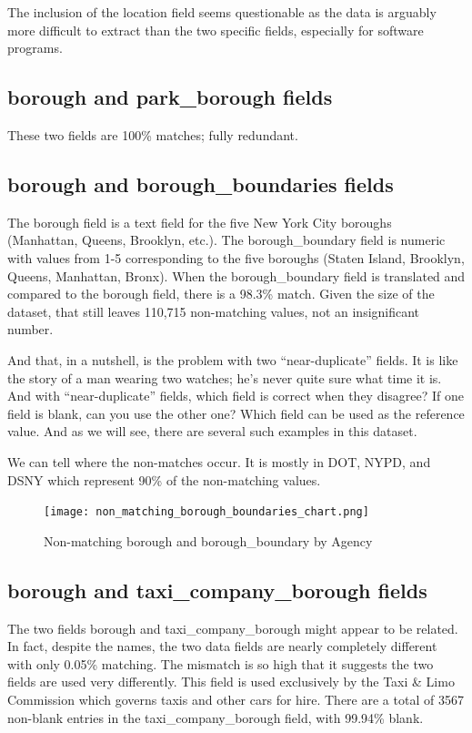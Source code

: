 \documentclass[12pt, titlepage]{article}
\begin{document}
{The inclusion of the location field seems questionable as the data is arguably more difficult to extract than the two specific fields, especially for
software programs.

\subsection{borough and park\_borough fields}  These two fields are 100\% matches; fully redundant.

\subsection{borough and borough\_boundaries fields}  The borough field is a text field for the five New York City boroughs (Manhattan, Queens, Brooklyn, etc.).
The borough\_boundary field is numeric with values from 1-5 corresponding to the five boroughs (Staten Island, Brooklyn, Queens, Manhattan, Bronx).
When the borough\_boundary field is translated and compared to the borough field, there is a 98.3\% match. Given the size of the dataset, that 
still leaves 110,715 non-matching values, not an insignificant number.  

And that, in a nutshell, is the problem with two ``near-duplicate'' fields. It is like the  story of a man wearing two watches; he's never
quite sure what time it is. And with ``near-duplicate'' fields, which field is correct when they disagree? 
If one field is blank, can you use the other one? Which field can be used as the reference value.
 And as we will see, there are several such examples in this dataset.

We can tell where the non-matches occur. It is mostly in DOT, NYPD, and DSNY which represent 90\% of the non-matching values.

	\begin{figure}[H]
		 \centering
		 \texttt{[image: non\_matching\_borough\_boundaries\_chart.png]}
		 \caption{Non-matching borough and borough\_boundary by Agency }
		 \label{fig:borough-boundaries}
	\end{figure}	
	
\subsection{borough and taxi\_company\_borough fields}
The two fields borough and taxi\_company\_borough might appear to be related. In fact, despite the names, 
the two data fields are nearly completely different with only 0.05\% matching. The mismatch is so
high that it suggests the two fields are used very differently.  This field is used exclusively by the 
Taxi \& Limo Commission which governs taxis and other cars for hire.
There are a total of 3567 non-blank entries in the taxi\_company\_borough field, with 99.94\% blank.

}
\end{document}
